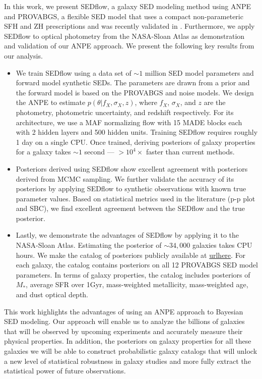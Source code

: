 In this work, we present {\sc SEDflow}, a galaxy SED modeling method using ANPE
and PROVABGS, a flexible SED model that uses a compact non-parameteric SFH and
ZH prescriptions and was recently validated in \cite{hahn2022}.
Furthermore, we apply {\sc SEDflow} to optical photometry from the NASA-Sloan
Atlas as demonstration and validation of our ANPE approach.  
We present the following key results from our analysis.
\begin{itemize}
    \item We train {\sc SEDflow} using a data set of ${\sim}1$ million SED
        model parameters and forward model synthetic SEDs.
        The parameters are drawn from a prior and the forward model is based on
        the PROVABGS and noise models. 
        We design the ANPE to estimate $p(\theta | f_X, \sigma_X, z)$, where
        $f_X$, $\sigma_X$, and $z$ are the photometry, photometric uncertainty,
        and redshift respectively. 
        For its architecture, we use a MAF normalizing flow with 15 MADE blocks
        each with 2 hidden layers and 500 hidden units.
        Training {\sc SEDflow} requires roughly 1 day on a single CPU. 
        Once trained, deriving posteriors of galaxy properties for a galaxy
        takes ${\sim}1$ second --- $>10^4\times$ faster than current 
        methods.
    \item Posteriors derived using {\sc SEDflow} show excellent agreement with
        posteriors derived from MCMC sampling. 
        We further validate the accuracy of its posteriors by applying  {\sc
        SEDflow} to synthetic observations with known true parameter values.  
        Based on statistical metrics used in the literature (p-p plot and SBC),
        we find excellent agreement between the {\sc SEDflow} and the true
        posterior. 
    \item Lastly, we demonstrate the advantages of {\sc SEDflow} by applying it
        to the NASA-Sloan Atlas.
        Estimating the posterior of ${\sim}34,000$ galaxies takes  
        CPU hours. 
        We make the catalog of posteriors publicly available at \url{urlhere}. 
        For each galaxy, the catalog contains posteriors on all 12 PROVABGS
        SED model parameters.
        In terms of galaxy properties, the catalog includes posteriors of
        $M_*$, average SFR over 1Gyr, mass-weighted metallicity, mass-weighted
        age, and dust optical depth. 
\end{itemize}

This work highlights the advantages of using an ANPE approach to Bayesian SED
modeling.  
Our approach will enable us to analyze the billions of galaxies that will be
observed by upcoming experiments and accurately measure their physical
properties. 
In addition, the posteriors on galaxy properties for all these galaxies we will
be able to construct probabilistic galaxy catalogs that will unlock a new level
of statistical robustness in galaxy studies and more fully extract the
statistical power of future observations.

